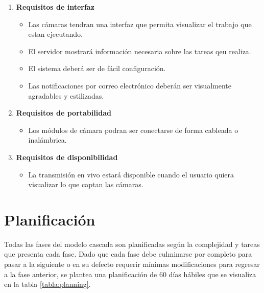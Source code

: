\begin{enumerate}
    \item  \textbf{Requisitos de interfaz} 
        \begin{itemize}
            \item Las cámaras tendran una interfaz que permita visualizar el trabajo que estan ejecutando.
            \item El servidor mostrará información necesaria sobre las tareas qeu realiza.
            \item El sistema deberá ser de fácil configuración.
            \item Las notificaciones por correo electrónico deberán ser visualmente agradables y estilizadas.
        \end{itemize}
    \item \textbf{Requisitos de portabilidad}
        \begin{itemize}
            \item Los módulos de cámara podran ser conectarse de forma cableada o inalámbrica.
        \end{itemize}
    \item \textbf{Requisitos de disponibilidad}
        \begin{itemize}
            \item La transmisión en vivo estará disponible cuando el usuario quiera visualizar lo que captan las cámaras.
        \end{itemize}
\end{enumerate}

\section{Planificación}
Todas las fases del modelo cascada son planificadas según la complejidad y tareas que presenta cada fase. Dado que cada fase debe culminarse por completo para pasar a la siguiente o en su defecto requerir mínimas modificaciones para regresar a la fase anterior, se plantea una planificación de 60 días hábiles que se visualiza en la tabla \ref{tabla:planning}.\\

